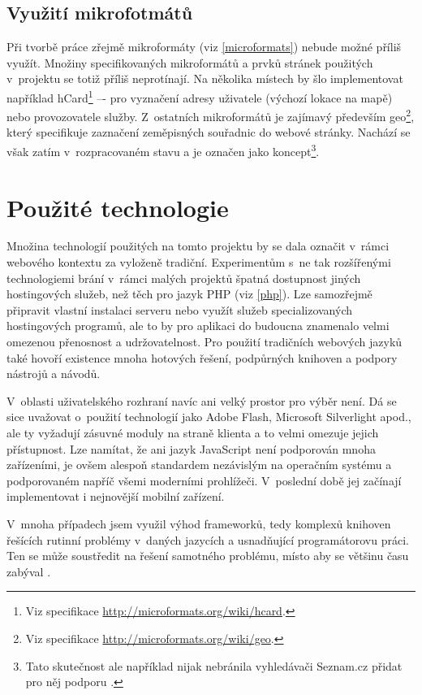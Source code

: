\section{Využití mikrofotmátů}
Při tvorbě práce zřejmě mikroformáty (viz \ref{microformats}) nebude možné
příliš využít. Množiny specifikovaných mikroformátů a prvků stránek použitých
v~projektu se totiž příliš neprotínají. Na několika místech by šlo
implementovat například
hCard\footnote{Viz
specifikace \url{http://microformats.org/wiki/hcard}.} –- pro
vyznačení adresy uživatele (výchozí lokace na mapě) nebo
provozovatele služby. Z~ostatních mikroformátů je zajímavý především
geo\footnote{Viz specifikace
\url{http://microformats.org/wiki/geo}.}, který specifikuje zaznačení
zeměpisných souřadnic do webové stránky. Nachází se však zatím
v~rozpracovaném stavu a je označen jako koncept\footnote{Tato
skutečnost ale například nijak nebránila vyhledávači Seznam.cz přidat
pro něj podporu \cite{geoSeznam}.}.

\chapter{Použité technologie}\label{technologie}
Množina technologií použitých na tomto projektu by se dala označit
v~rámci webového kontextu za vyloženě tradiční. Experimentům s~ne tak
rozšířenými technologiemi brání v~rámci malých projektů špatná
dostupnost jiných hostingových služeb, než těch pro jazyk PHP (viz
\ref{php}). Lze samozřejmě připravit vlastní instalaci serveru nebo
využít služeb specializovaných hostingových programů, ale to by pro aplikaci do
budoucna znamenalo velmi omezenou přenosnost a udržovatelnost. Pro
použití tradičních webových jazyků také hovoří existence mnoha
hotových řešení, podpůrných knihoven a podpory nástrojů a návodů.

V~oblasti uživatelského rozhraní navíc ani velký prostor pro výběr
není. Dá se sice uvažovat o~použití technologií jako Adobe Flash, Microsoft
Silverlight apod., ale ty vyžadují zásuvné moduly na straně klienta
a to velmi omezuje jejich přístupnost. Lze namítat, že ani jazyk
JavaScript není podporován mnoha zařízeními, je ovšem alespoň
standardem nezávislým na operačním systému a podporovaném napříč všemi
moderními prohlížeči. V~poslední době jej začínají implementovat i
nej\-novější mobilní zařízení.

V~mnoha případech jsem využil výhod frameworků, tedy komplexů
knihoven řešících rutinní problémy v~daných jazycích a usnadňující
programátorovu práci. Ten se může soustředit na řešení samotného
problému, místo aby se většinu času zabýval .


